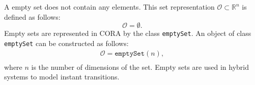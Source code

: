  \label{sec:emptySet}

A empty set does not contain any elements.
This set representation $\mathcal{O} \subset \mathbb{R}^n$ is defined as follows:
\begin{equation}
	\mathcal{O} = \emptyset.
	\label{eq:defEmptySet}
\end{equation}
Empty sets are represented in CORA by the class \texttt{emptySet}.
An object of class \texttt{emptySet} can be constructed as follows:
\begin{equation*}
	\begin{split}
		\mathcal{O} = \texttt{emptySet}(n), \\
	\end{split}
\end{equation*}
where $n$ is the number of dimensions of the set.
Empty sets are used in hybrid systems to model instant transitions.
